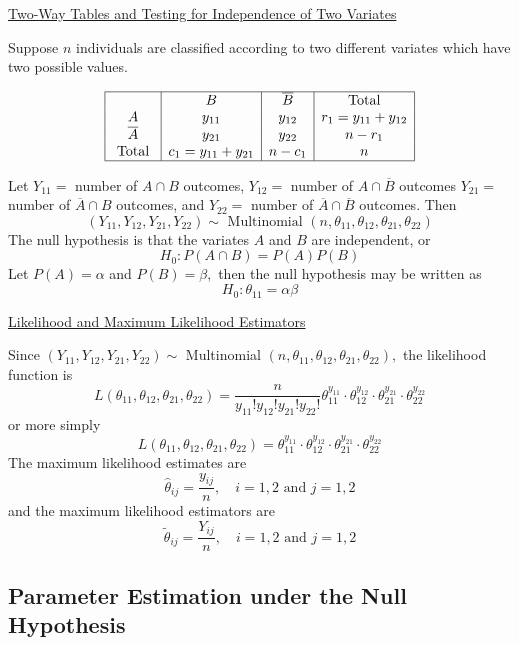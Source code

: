 \underline{Two-Way Tables and Testing for Independence of Two Variates}

Suppose $ n $ individuals are classified according to two different variates which have two possible values.

\[ \begin{array}{|c|c|c|c|}
        \hline          & B                   & \overline{B} & \text { Total }     \\
        A               & y_{11}              & y_{12}       & r_{1}=y_{11}+y_{12} \\
        \overline{A}    & y_{21}              & y_{22}       & n-r_{1}             \\
        \text { Total } & c_{1}=y_{11}+y_{21} & n-c_{1}      & n                   \\
        \hline
    \end{array} \]

Let $Y_{11}=$ number of $A \cap B$ outcomes, $Y_{12}=$ number of $A \cap \overline{B}$ outcomes $Y_{21}=$ number of $\overline{A} \cap B$ outcomes, and $Y_{22}=$ number of $\overline{A} \cap \overline{B}$ outcomes.
Then
\[
    \left(Y_{11}, Y_{12}, Y_{21}, Y_{22}\right) \sim \text { Multinomial }\left(n, \theta_{11}, \theta_{12}, \theta_{21}, \theta_{22}\right)
\]
The null hypothesis is that the variates $A$ and $B$ are independent, or
\[
    H_{0}: P(A \cap B)=P(A) P(B)
\]
Let $P(A)=\alpha$ and $P(B)=\beta,$ then the null hypothesis may be written as
\[
    H_{0}: \theta_{11}=\alpha \beta
\]

\underline{Likelihood and Maximum Likelihood Estimators}

Since $\left(Y_{11}, Y_{12}, Y_{21}, Y_{22}\right) \sim$ Multinomial $\left(n, \theta_{11}, \theta_{12}, \theta_{21}, \theta_{22}\right),$ the likelihood function is
\[
    L\left(\theta_{11}, \theta_{12}, \theta_{21}, \theta_{22}\right)=\frac{n}{y_{11} ! y_{12} ! y_{21} ! y_{22} !} \theta_{11}^{y_{11}} \cdot \theta_{12}^{y_{12}} \cdot \theta_{21}^{y_{21}} \cdot \theta_{22}^{y_{22}}
\]
or more simply
\[
    L\left(\theta_{11}, \theta_{12}, \theta_{21}, \theta_{22}\right)=\theta_{11}^{y_{11}} \cdot \theta_{12}^{y_{12}} \cdot \theta_{21}^{y_{21}} \cdot \theta_{22}^{y_{22}}
\]
The maximum likelihood estimates are
\[
    \hat{\theta}_{i j}=\frac{y_{i j}}{n}, \quad i=1,2 \text { and } j=1,2
\]
and the maximum likelihood estimators are
\[
    \tilde{\theta}_{i j}=\frac{Y_{i j}}{n}, \quad i=1,2 \text { and } j=1,2
\]

\subsection{Parameter Estimation under the Null Hypothesis}

